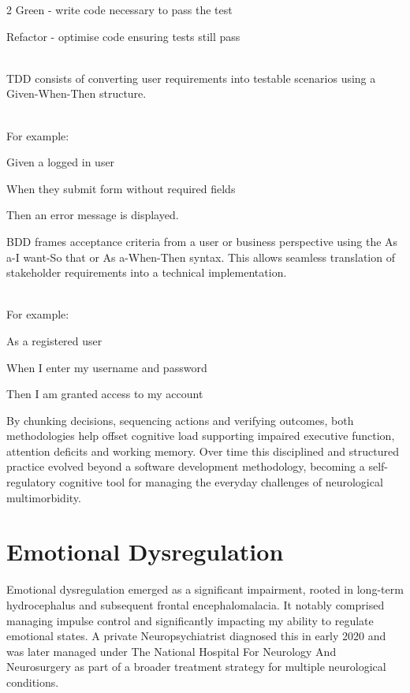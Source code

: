\documentclass{article}
\begin{document}
\begin{multicols}{2}
Green - write code necessary to pass the test

Refactor - optimise code ensuring tests still pass

\noindent\\TDD consists of converting user requirements into testable scenarios using a Given-When-Then structure.

\noindent
\\
For example:
\\
\par
Given a logged in user

When they submit form without required fields

Then an error message is displayed.
\\
\par
\noindent
BDD frames acceptance criteria from a user or business perspective using the As a-I want-So that or As a-When-Then syntax. This allows seamless translation of stakeholder requirements into a technical implementation.\cite{north2006,chelimsky2010}

\noindent
\\
For example:
\\
\par
As a registered user

When I enter my username and password

Then I am granted access to my account
\\
\par
By chunking decisions, sequencing actions and verifying outcomes, both methodologies help offset cognitive load supporting impaired executive function, attention deficits and working memory. Over time this disciplined and structured practice evolved beyond a software development methodology, becoming a self-regulatory cognitive tool for managing the everyday challenges of neurological multimorbidity.\cite{zimmerman2000}

\section*{Emotional Dysregulation}
Emotional dysregulation emerged as a significant impairment, rooted in long-term hydrocephalus and subsequent frontal encephalomalacia. It notably comprised managing impulse control and significantly impacting my ability to regulate emotional states. A private Neuropsychiatrist diagnosed this in early 2020 and was later managed under The National Hospital For Neurology And Neurosurgery as part of a broader treatment strategy for multiple neurological conditions.


\end{multicols}
\end{document}

